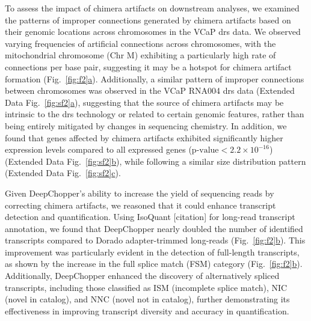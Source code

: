 \documentclass[pdflatex,sn-nature, lineno]{sn-jnl}%
\newcommand{\figref}[2]{Fig.~\hyperref[#1]{\ref*{#1}#2}}
\newcommand{\edfigref}[2]{Extended Data Fig.~\hyperref[#1]{\ref*{#1}#2}}
\theoremstyle{thmstyleone}%
\theoremstyle{thmstyletwo}%
\theoremstyle{thmstylethree}%
\begin{document}
To assess the impact of chimera artifacts on downstream analyses, we examined the patterns of improper connections generated by chimera artifacts based on their genomic locations across chromosomes in the VCaP \gls{drs} data. We observed varying frequencies of artificial connections across chromosomes, with the mitochondrial chromosome (Chr M) exhibiting a particularly high rate of connections per base pair, suggesting it may be a hotspot for chimera artifact formation (\figref{fig:f2}{a}). Additionally, a similar pattern of improper connections between chromosomes was observed in the VCaP RNA004 \gls{drs} data (\edfigref{fig:sf2}{a}), suggesting that the source of chimera artifacts may be intrinsic to the \gls{drs} technology or related to certain genomic features, rather than being entirely mitigated by changes in sequencing chemistry. In addition, we found that genes affected by chimera artifacts exhibited significantly higher expression levels compared to all expressed genes (\(\textrm{p-value} < 2.2 \times 10^{-16}\)) (\edfigref{fig:sf2}{b}), while following a similar size distribution pattern (\edfigref{fig:sf2}{c}).

Given DeepChopper's ability to increase the yield of sequencing reads by correcting chimera artifacts, we reasoned that it could enhance transcript detection and quantification. Using IsoQuant [citation] for long-read transcript annotation, we found that DeepChopper nearly doubled the number of identified transcripts compared to Dorado adapter-trimmed long-reads (\figref{fig:f2}{b}). This improvement was particularly evident in the detection of full-length transcripts, as shown by the increase in the full splice match (FSM) category (\figref{fig:f2}{b}). Additionally, DeepChopper enhanced the discovery of alternatively spliced transcripts, including those classified as ISM (incomplete splice match), NIC (novel in catalog), and NNC (novel not in catalog), further demonstrating its effectiveness in improving transcript diversity and accuracy in quantification.
\end{document}
